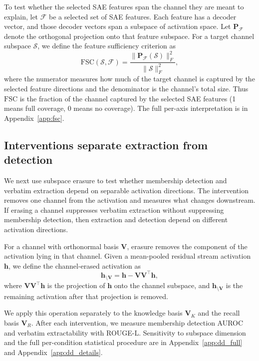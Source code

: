To test whether the selected SAE features span the channel they are meant to explain, let $\mathcal{F}$ be a selected set of SAE features. Each feature has a decoder vector, and those decoder vectors span a subspace of activation space. Let
$\mathbf{P}_{\mathcal{F}}$ denote the orthogonal projection onto that feature subspace. For a target channel subspace $\mathcal{S}$, we define the feature
sufficiency criterion as
\begin{equation}
\mathrm{FSC}(\mathcal{S}, \mathcal{F})
=
\frac{\|\mathbf{P}_{\mathcal{F}}(\mathcal{S})\|_F^2}
 {\|\mathcal{S}\|_F^2},
\label{eq:fsc}
\end{equation}
\noindent where the numerator measures how much of the target channel is captured by the selected feature directions and the denominator is the channel's total size. Thus $\mathrm{FSC}$ is the fraction of the channel captured by the selected SAE features (1 means full coverage, 0 means no coverage). The full per-axis interpretation is in Appendix~\ref{app:fsc}.

\subsection{Interventions separate extraction from detection}
\label{sec:methods:dd}

We next use subspace erasure to test whether membership detection and verbatim extraction depend on separable activation directions. The intervention removes one channel from the
activation and measures what changes downstream. If erasing a channel suppresses verbatim extraction without suppressing membership detection, then
extraction and detection depend on different activation directions.

For a channel with orthonormal basis $\mathbf{V}$, erasure removes the component of the activation lying in that channel. Given a mean-pooled residual
stream activation $\mathbf{h}$, we define the channel-erased activation as
\begin{equation}
\mathbf{h}_{\setminus \mathbf{V}}
=
\mathbf{h} - \mathbf{V}\mathbf{V}^{\top}\mathbf{h},
\label{eq:subspace_erasure}
\end{equation}
\noindent where $\mathbf{V}\mathbf{V}^{\top}\mathbf{h}$ is the projection of $\mathbf{h}$ onto the channel subspace, and $\mathbf{h}_{\setminus \mathbf{V}}$ is the
remaining activation after that projection is removed.

We apply this operation separately to the knowledge basis $\mathbf{V}_K$ and the recall basis $\mathbf{V}_R$. After each intervention, we measure membership detection AUROC and verbatim extractability with ROUGE-L. Sensitivity to subspace dimension and the full per-condition statistical procedure are in Appendix~\ref{app:dd_full} and Appendix~\ref{app:dd_details}.

